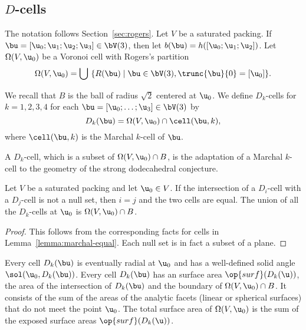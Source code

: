 \subsection{$D$-cells}



The notation follows Section~\ref{sec:rogers}.  Let $V$ be a saturated
packing. If $\bu =[\u_0;\u_1;\u_2;\u_3]\in \bV(3)$, then let $b(\bu) = h([
\u_0; \u_1; \u_2])$.  
Let $\Omega( V,\u_0)$ be a Voronoi cell with  Rogers's partition 
\[
\Omega(V, \u_0) = \bigcup \ \{ R( \bu) \mid { \bu\in  \bV(3), \trunc{\bu}{0}= [\u_0] }\}.
\]
%
%

\begin{definition}[$D_k$-cell]
  We recall that $B$ is the ball of radius $\sqrt2$ centered at
  $\u_0$.  We define $D_k$-cells for $k=1,2,3,4$ for each $
  \bu=[\u_0;\ldots;\u_3]\in \bV(3)$ by
\[
D_k(\bu) = \Omega(V,\u_0)\cap \cell(\bu,k),
\]
where $\cell(\bu,k)$ is the  Marchal $k$-cell of $\bu$.
\end{definition}
%
%
%


A $D_k$-cell, which is a subset of
$\Omega(V,\u_0)\cap B$, is the adaptation of a Marchal $k$-cell to the
geometry of the strong dodecahedral conjecture.  

\begin{lemma}[]
  Let $V$ be a saturated packing and let $\u_0\in V$.  If the intersection
of a $D_i$-cell with a $D_j$-cell is not a null set, then $i=j$ and the two
cells are equal.   The union
  of all the $D_k$-cells at $\u_0$ is $\Omega(V, \u_0)\cap B$.
\end{lemma}
%

\begin{proof} This follows from the corresponding facts for cells in
  Lemma~\ref{lemma:marchal-equal}.  Each null set is in fact a subset
  of a plane.
\end{proof}


Every cell $D_k(\bu)$ is eventually radial at $ \u_0$ and has a
well-defined solid angle $\sol(\u_0,D_k(\bu))$.  Every cell $D_k(\bu)$ has
an  surface area $\op{surf}(D_k(\u))$, the area of
the intersection of $D_k(\bu)$ and the boundary of $\Omega(V,
\u_0)\cap B$.  It consists of the sum of the areas of the analytic
facets (linear or spherical surfaces) that do not meet the point $
\u_0$.  The total surface area of $\Omega(V,\u_0)$ is the sum of the
exposed surface areas $\op{surf}(D_k(\u))$.  %

